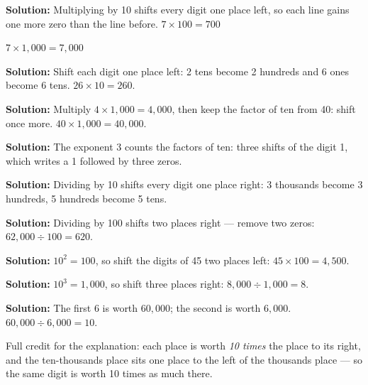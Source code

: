 \documentclass[12pt]{article}
\begin{document}



\textbf{Solution:} Multiplying by 10 shifts every digit one place left, so each
line gains one more zero than the line before. $7 \times 100 = 700$ 

$7 \times 1{,}000 = 7{,}000$ 


\textbf{Solution:} Shift each digit one place left: 2 tens become 2 hundreds and
6 ones become 6 tens. $26 \times 10 = 260$. 


\textbf{Solution:} Multiply $4 \times 1{,}000 = 4{,}000$, then keep the factor
of ten from 40: shift once more. $40 \times 1{,}000 = 40{,}000$. 


\textbf{Solution:} The exponent 3 counts the factors of ten: three shifts of the
digit 1, which writes a 1 followed by three zeros. 


\textbf{Solution:} Dividing by 10 shifts every digit one place right: 3
thousands become 3 hundreds, 5 hundreds become 5 tens. 


\textbf{Solution:} Dividing by 100 shifts two places right — remove two zeros:
$62{,}000 \div 100 = 620$. 


\textbf{Solution:} $10^2 = 100$, so shift the digits of 45 two places left:
$45 \times 100 = 4{,}500$. 


\textbf{Solution:} $10^3 = 1{,}000$, so shift three places right:
$8{,}000 \div 1{,}000 = 8$. 


\textbf{Solution:} The first 6 is worth $60{,}000$; the second is worth
$6{,}000$. $60{,}000 \div 6{,}000 = 10$. 

Full credit for the explanation: each place is worth \emph{10 times} the place
to its right, and the ten-thousands place sits one place to the left of the
thousands place — so the same digit is worth 10 times as much there.
\end{document}

